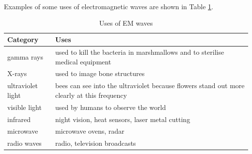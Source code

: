     \par
      \label{m38778*id188548}Examples of some uses of electromagnetic waves are shown in Table \ref{Table:EMUses}.\par 
          \begin{table}[H]
        \begin{center}
      \label{m38778*uid9}
    \noindent
    
      \begin{tabular}{|l|l|}\hline
                \textbf{Category}
               &
                \textbf{Uses}
              \\ \hline
        gamma rays &
        used to kill the bacteria in marshmallows and to sterilise medical equipment \\ \hline
        X-rays &
        used to image bone structures \\ \hline
        ultraviolet light &
        bees can see into the ultraviolet because flowers stand out more clearly at this frequency \\ \hline
        visible light &
        used by humans to observe the world \\ \hline
        infrared &
        night vision, heat sensors, laser metal cutting \\ \hline
        microwave &
        microwave ovens, radar \\ \hline
        radio waves &
        radio, television broadcasts \\ \hline
    \end{tabular}
      \end{center}\label{Table:EMUses}
        \caption{
	  Uses of EM waves
	}
\end{table}

